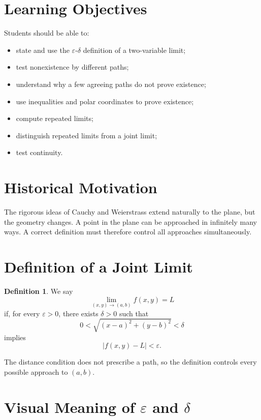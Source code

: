 \documentclass[11pt,oneside]{book}
\theoremstyle{studentthm}
\theoremstyle{definition}
\newtheorem{definition}[theorem]{Definition}
\newcommand{\eps}{\varepsilon}
\newcommand{\abs}[1]{\left|#1\right|}
\begin{document}
\section*{Learning Objectives}
Students should be able to:
\begin{itemize}
\item state and use the \(\eps\)-\(\delta\) definition of a
two-variable limit;
\item test nonexistence by different paths;
\item understand why a few agreeing paths do not prove existence;
\item use inequalities and polar coordinates to prove existence;
\item compute repeated limits;
\item distinguish repeated limits from a joint limit;
\item test continuity.
\end{itemize}

\section*{Historical Motivation}

The rigorous ideas of Cauchy and Weierstrass extend naturally to the
plane, but the geometry changes. A point in the plane can be
approached in infinitely many ways. A correct definition must
therefore control all approaches simultaneously.

\section{Definition of a Joint Limit}

\begin{definition}
We say
\[
\lim_{(x,y)\to(a,b)}f(x,y)=L
\]
if, for every \(\eps>0\), there exists \(\delta>0\) such that
\[
0<
\sqrt{(x-a)^2+(y-b)^2}
<\delta
\]
implies
\[
\abs{f(x,y)-L}<\eps.
\]
\end{definition}

The distance condition does not prescribe a path, so the definition
controls every possible approach to \((a,b)\).

\section{Visual Meaning of \(\eps\) and \(\delta\)}

\begin{center}
\end{center}
\end{document}
